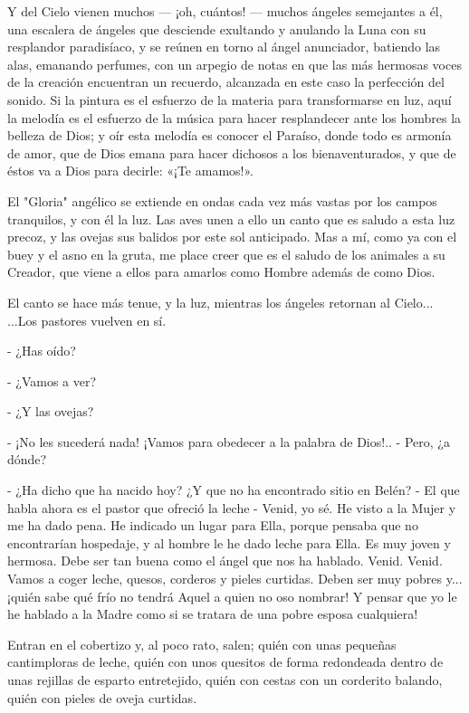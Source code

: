 \documentclass[12pt]{book} %
\begin{document}
Y del Cielo vienen muchos — ¡oh, cuántos! — muchos ángeles semejantes a él, una escalera de ángeles que desciende exultando y anulando la Luna con su resplandor paradisíaco, y se reúnen en torno al ángel anunciador, batiendo las alas, emanando perfumes, con un arpegio de notas en que las más hermosas voces de la creación encuentran un recuerdo, alcanzada en este caso la perfección del sonido. Si la pintura es el esfuerzo de la materia para transformarse en luz, aquí la melodía es el esfuerzo de la música para hacer resplandecer ante los hombres la belleza de Dios; y oír esta melodía es conocer el Paraíso, donde todo es armonía de amor, que de Dios emana para hacer dichosos a los bienaventurados, y que de éstos va a Dios para decirle: «¡Te amamos!». 

El "Gloria" angélico se extiende en ondas cada vez más vastas por los campos tranquilos, y con él la luz. Las aves unen a ello un canto que es saludo a esta luz precoz, y las ovejas sus balidos por este sol anticipado. Mas a mí, como ya con el buey y el asno en la gruta, me place creer que es el saludo de los animales a su Creador, que viene a ellos para amarlos como Hombre además de como Dios. 

El canto se hace más tenue, y la luz, mientras los ángeles retornan al Cielo... ...Los pastores vuelven en sí. 

- ¿Has oído? 

- ¿Vamos a ver? 

- ¿Y las ovejas? 

- ¡No les sucederá nada! ¡Vamos para obedecer a la palabra de Dios!.. - Pero, ¿a dónde? 

- ¿Ha dicho que ha nacido hoy? ¿Y que no ha encontrado sitio en Belén? - El que habla ahora es el pastor que ofreció la leche - Venid, yo sé. He visto a la Mujer y me ha dado pena. He indicado un lugar para Ella, porque pensaba que no encontrarían hospedaje, y al hombre le he dado leche para Ella. Es muy joven y hermosa. Debe ser tan buena como el ángel que nos ha hablado. Venid. Venid. Vamos a coger leche, quesos, corderos y pieles curtidas. Deben ser muy pobres y... ¡quién sabe qué frío no tendrá Aquel a quien no oso nombrar! Y pensar que yo le he hablado a la Madre como si se tratara de una pobre esposa cualquiera!

Entran en el cobertizo y, al poco rato, salen; quién con unas pequeñas cantimploras de leche, quién con unos quesitos de forma redondeada dentro de unas rejillas de esparto entretejido, quién con cestas con un corderito balando, quién con pieles de oveja curtidas. 
\end{document}
